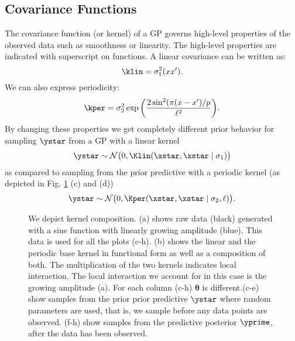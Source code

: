 \subsection{Covariance Functions}
The covariance function (or kernel) of a \ac{GP} governs high-level properties
of the observed data such as smoothness or linearity. The high-level properties
are indicated with superscript on functions.  A linear covariance can be written as:
\begin{equation}\label{eq:LIN1}
    \klin =   \sigma_1^2(x x^\prime).
\end{equation}
We can also express periodicity:
\begin{equation}\label{eq:PER1}
    \kper =  \sigma_2^2 \exp \bigg( \frac{2 \sin^2 ( \pi (x - x^\prime)/p}{\ell^2} \bigg). 
\end{equation}
By changing these properties we get completely different prior behavior for sampling $\ystar$ from a
\ac{GP} with a linear kernel
\[
\ystar \sim \mathcal{N}\big(0,\Klin(\xstar,\xstar \mid \sigma_1 )\big)
\]
as compared to sampling from the prior predictive with a periodic kernel (as depicted in 
Fig. \ref{fig:composition_tutorial} (c) and (d))
\[
\ystar \sim \mathcal{N}\big(0,\Kper(\xstar,\xstar \mid \sigma_2, \ell )\big).
\]
\begin{figure}

\caption{We depict kernel composition. 
(a) shows raw data (black) generated with a sine function with linearly growing amplitude (blue).
This data is used for all the plots (c-h). 
(b) shows the linear and the periodic base kernel in functional form as well as a composition of both. 
The multiplication of the two kernels indicates local interaction. The local interaction we account for in this case is the growing amplitude (a). For each column (c-h) $\bm{\theta}$ is different.(c-e) show samples from the prior
prior predictive $\ystar$ where random parameters are used, that is, we sample before any data points are observed.
(f-h) show samples from the predictive posterior $\yprime$, after the data has been observed.}
\label{fig:composition_tutorial}
\end{figure}
